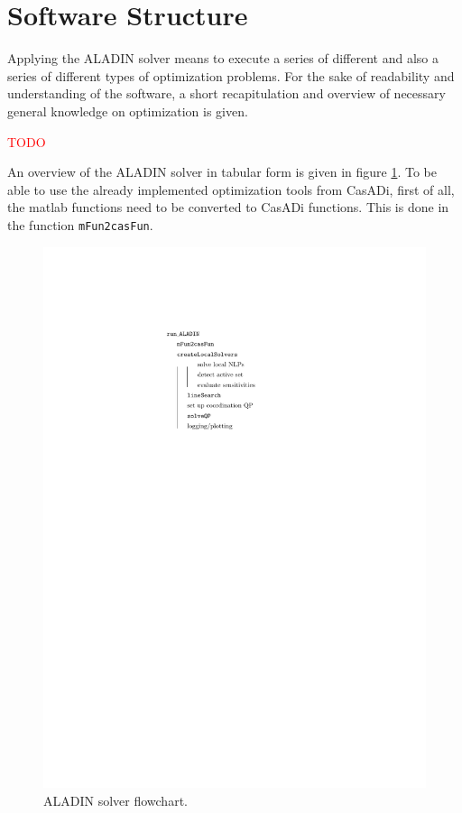\documentclass[]{scrartcl}
\begin{document}
\section{Software Structure}
Applying the ALADIN solver means to execute a series of different and also a series of different types of optimization problems. For the sake of readability and understanding of the software, a short recapitulation and overview of necessary general knowledge on optimization is given.

\textcolor{red}{TODO}

 An overview of the ALADIN solver in tabular form is given in figure \ref{fig:flowchart}. To be able to use the already implemented optimization tools from CasADi, first of all, the matlab functions need to be converted to CasADi functions. This is done in the function \texttt{mFun2casFun}. 
\begin{figure}[htb]
	\centering
	\includegraphics[width=0.3\linewidth]{figures/flowChart}
	\caption{ALADIN solver flowchart.}
	\label{fig:flowchart}
\end{figure}
\end{document}
